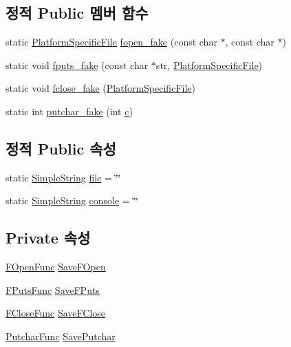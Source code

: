 \subsection*{정적 Public 멤버 함수}
\begin{DoxyCompactItemize}
\item 
static \hyperlink{_platform_specific_functions__c_8h_aaf5f8ce358a1fbc166f085cddadd030c}{Platform\+Specific\+File} \hyperlink{struct_fake_output_a8026fc6dff256363ca579f102ec0b72f}{fopen\+\_\+fake} (const char $\ast$, const char $\ast$)
\item 
static void \hyperlink{struct_fake_output_a0dece8a5c9ccd98bd10b090d45e6f7ac}{fputs\+\_\+fake} (const char $\ast$str, \hyperlink{_platform_specific_functions__c_8h_aaf5f8ce358a1fbc166f085cddadd030c}{Platform\+Specific\+File})
\item 
static void \hyperlink{struct_fake_output_ae21a77206e7c322bdc580c643eab6b51}{fclose\+\_\+fake} (\hyperlink{_platform_specific_functions__c_8h_aaf5f8ce358a1fbc166f085cddadd030c}{Platform\+Specific\+File})
\item 
static int \hyperlink{struct_fake_output_aaee59c0c00a4c4f82f9dbfe9ed98f6f0}{putchar\+\_\+fake} (int \hyperlink{shaper__daemon_8c_a4e1e0e72dd773439e333c84dd762a9c3}{c})
\end{DoxyCompactItemize}
\subsection*{정적 Public 속성}
\begin{DoxyCompactItemize}
\item 
static \hyperlink{class_simple_string}{Simple\+String} \hyperlink{struct_fake_output_a8fa12252d975e05c9fd1f95616eaec1d}{file} = \char`\"{}\char`\"{}
\item 
static \hyperlink{class_simple_string}{Simple\+String} \hyperlink{struct_fake_output_a8e543e88a79ec4b9a840554c39b20580}{console} = \char`\"{}\char`\"{}
\end{DoxyCompactItemize}
\subsection*{Private 속성}
\begin{DoxyCompactItemize}
\item 
\hyperlink{_command_line_test_runner_test_8cpp_af4f4c16514a20df31fe6e96fd7f736b5}{F\+Open\+Func} \hyperlink{struct_fake_output_a0c39f7dcad1913f04f7e02de6e62f96f}{Save\+F\+Open}
\item 
\hyperlink{_command_line_test_runner_test_8cpp_ac2325f06f9eb55811a6211e59d9ac4af}{F\+Puts\+Func} \hyperlink{struct_fake_output_a9da20fa712f95cad317ca6f34d8ae6e8}{Save\+F\+Puts}
\item 
\hyperlink{_command_line_test_runner_test_8cpp_a9581a22863a82a585948835f21b179f3}{F\+Close\+Func} \hyperlink{struct_fake_output_a133ec4c951d2f641022289f3641acdc9}{Save\+F\+Close}
\item 
\hyperlink{_command_line_test_runner_test_8cpp_af3f2e62197cc76dfbb28241714cf9cf2}{Putchar\+Func} \hyperlink{struct_fake_output_a224a3276595572e59b4ae35e848ad8ec}{Save\+Putchar}
\end{DoxyCompactItemize}


